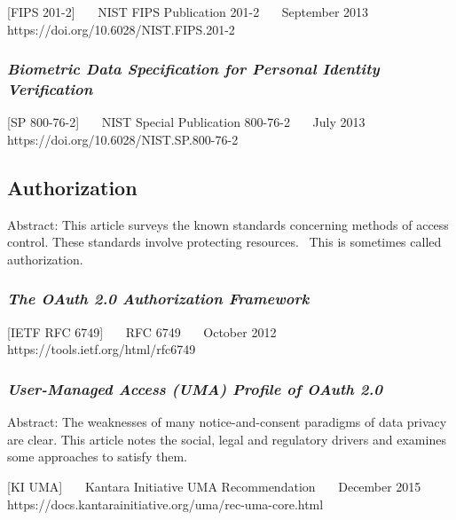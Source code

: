 {[}FIPS 201-2{]}~~~ NIST FIPS Publication 201-2~~~ September 2013~~~
https://doi.org/10.6028/NIST.FIPS.201-2~~~

\hypertarget{biometric-data-specification-for-personal-identity-verification}{%
\subsubsection{\texorpdfstring{\emph{Biometric Data Specification for
Personal Identity
Verification}}{Biometric Data Specification for Personal Identity Verification}}\label{biometric-data-specification-for-personal-identity-verification}}

{[}SP 800-76-2{]}~~~ NIST Special Publication 800-76-2~~~ July 2013~~~
https://doi.org/10.6028/NIST.SP.800-76-2~~~

\hypertarget{authorization-1}{%
\subsection{Authorization}\label{authorization-1}}

Abstract: This article surveys the known standards concerning methods of
access control. These standards involve protecting resources.~ This is
sometimes called authorization.

\hypertarget{the-oauth-2.0-authorization-framework}{%
\subsubsection{\texorpdfstring{\emph{The OAuth 2.0 Authorization
Framework}}{The OAuth 2.0 Authorization Framework}}\label{the-oauth-2.0-authorization-framework}}

{[}IETF RFC 6749{]}~~~ RFC 6749~~~ October 2012~~~
https://tools.ietf.org/html/rfc6749~~~

\hypertarget{user-managed-access-uma-profile-of-oauth-2.0}{%
\subsubsection{\texorpdfstring{\emph{User-Managed Access (UMA) Profile of
OAuth
2.0}}{User-Managed Access (UMA) Profile of OAuth 2.0}}\label{user-managed-access-uma-profile-of-oauth-2.0}}

Abstract: The weaknesses of many notice-and-consent paradigms of data
privacy are clear. This article notes the social, legal and regulatory
drivers and examines some approaches to satisfy them.

{[}KI UMA{]}~~~ Kantara Initiative UMA Recommendation~~~ December
2015~~~ https://docs.kantarainitiative.org/uma/rec-uma-core.html~~~

